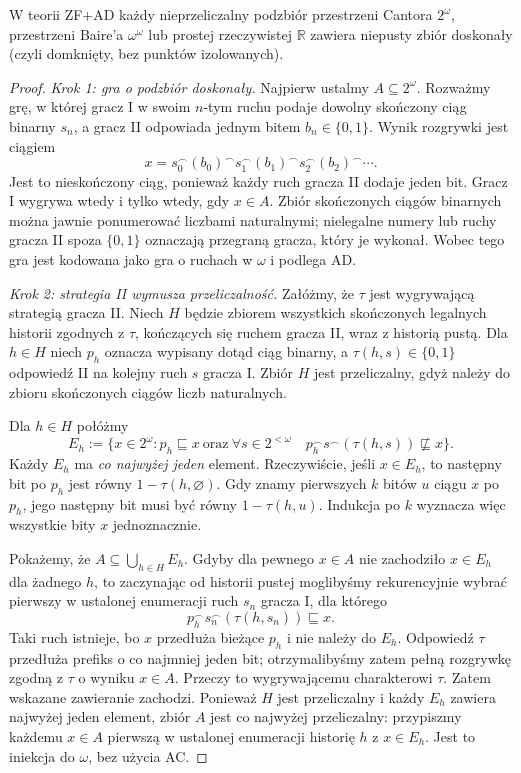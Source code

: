 \begin{twierdzenie}
\label{thm:ad-perfect-set}
W teorii ZF+$\mathrm{AD}$ każdy nieprzeliczalny
podzbiór przestrzeni Cantora $2^\omega$,
przestrzeni Baire'a $\omega^\omega$
lub prostej rzeczywistej $\mathbb R$
zawiera niepusty zbiór doskonały
(czyli domknięty, bez punktów izolowanych).
\end{twierdzenie}
\begin{proof}
\emph{Krok 1: gra o podzbiór doskonały.}
Najpierw ustalmy $A\subseteq2^\omega$.
Rozważmy grę, w której gracz I
w swoim $n$-tym ruchu podaje
dowolny skończony ciąg binarny $s_n$,
a gracz II odpowiada jednym bitem
$b_n\in\{0,1\}$.
Wynik rozgrywki jest ciągiem
\[
x=s_0^\frown(b_0)^\frown s_1^\frown(b_1)
          ^\frown s_2^\frown(b_2)^\frown\cdots.
\]
Jest to nieskończony ciąg, ponieważ
każdy ruch gracza II dodaje jeden bit.
Gracz I wygrywa wtedy i tylko wtedy,
gdy $x\in A$.
Zbiór skończonych ciągów binarnych
można jawnie ponumerować liczbami naturalnymi;
nielegalne numery lub ruchy
gracza II spoza $\{0,1\}$ oznaczają
przegraną gracza, który je wykonał.
Wobec tego gra jest kodowana jako gra
o ruchach w $\omega$ i podlega AD.

\emph{Krok 2: strategia II wymusza przeliczalność.}
Załóżmy, że $\tau$ jest wygrywającą strategią
gracza II.
Niech $H$ będzie zbiorem wszystkich
skończonych legalnych historii
zgodnych z $\tau$, kończących się
ruchem gracza II, wraz z historią pustą.
Dla $h\in H$ niech $p_h$
oznacza wypisany dotąd ciąg binarny,
a $\tau(h,s)\in\{0,1\}$ odpowiedź II
na kolejny ruch $s$ gracza I.
Zbiór $H$ jest przeliczalny,
gdyż należy do zbioru skończonych
ciągów liczb naturalnych.

Dla $h\in H$ połóżmy
\[
E_h:=\{x\in2^\omega:
 p_h\sqsubseteq x\ \text{oraz}\
 \forall s\in2^{<\omega}\quad
 p_h^\frown s^\frown(\tau(h,s))
              \not\sqsubseteq x\}.
\]
Każdy $E_h$ ma \emph{co najwyżej jeden}
element. Rzeczywiście, jeśli $x\in E_h$,
to następny bit po $p_h$ jest równy
$1-\tau(h,\varnothing)$.
Gdy znamy pierwszych $k$ bitów $u$
ciągu $x$ po $p_h$, jego następny bit
musi być równy $1-\tau(h,u)$.
Indukcja po $k$ wyznacza więc
wszystkie bity $x$ jednoznacznie.

Pokażemy, że
$A\subseteq\bigcup_{h\in H}E_h$.
Gdyby dla pewnego $x\in A$
nie zachodziło $x\in E_h$ dla żadnego
$h$, to zaczynając od historii pustej
moglibyśmy rekurencyjnie
wybrać pierwszy w ustalonej enumeracji
ruch $s_n$ gracza I, dla którego
\[
p_h^\frown s_n^\frown(\tau(h,s_n))
\sqsubseteq x.
\]
Taki ruch istnieje, bo $x$ przedłuża
bieżące $p_h$ i nie należy do $E_h$.
Odpowiedź $\tau$ przedłuża prefiks
o co najmniej jeden bit;
otrzymalibyśmy zatem pełną rozgrywkę
zgodną z $\tau$ o wyniku $x\in A$.
Przeczy to wygrywającemu
charakterowi $\tau$.
Zatem wskazane zawieranie zachodzi.
Ponieważ $H$ jest przeliczalny
i każdy $E_h$ zawiera najwyżej
jeden element, zbiór $A$ jest
co najwyżej przeliczalny:
przypiszmy każdemu $x\in A$
pierwszą w ustalonej enumeracji
historię $h$ z $x\in E_h$.
Jest to iniekcja do $\omega$,
bez użycia AC.


\end{proof}
